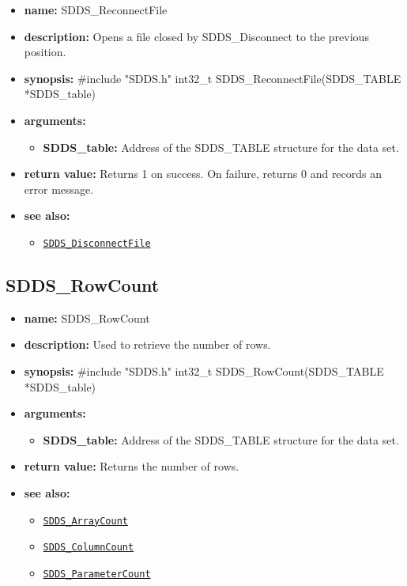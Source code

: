 \documentclass[11pt]{article}
\newcommand{\progref}[1]{\hyperref[SDDS_#1]{\tt SDDS\_#1}}
\begin{document}
\begin{itemize}
\item {\bf name:}\newline
SDDS\_ReconnectFile
\item {\bf description:}\newline
Opens a file closed by SDDS\_Disconnect to the previous position.
\item {\bf synopsis:} \#include "SDDS.h"\newline
int32\_t SDDS\_ReconnectFile(SDDS\_TABLE *SDDS\_table)
\item {\bf arguments:}
\begin{itemize}
\item {\bf SDDS\_table:} Address of the SDDS\_TABLE structure for the data set.
\end{itemize}
\item {\bf return value:}\newline
Returns 1 on success. On failure, returns 0 and records an error message.
\item {\bf see also:}
\begin{itemize}
\item \progref{DisconnectFile}
\end{itemize}
\end{itemize}

\subsection{SDDS\_RowCount}
\label{SDDS_RowCount}

\begin{itemize}
\item {\bf name:}\newline
SDDS\_RowCount
\item {\bf description:}\newline
Used to retrieve the number of rows.
\item {\bf synopsis:} \#include "SDDS.h"\newline
int32\_t SDDS\_RowCount(SDDS\_TABLE *SDDS\_table)
\item {\bf arguments:}
\begin{itemize}
\item {\bf SDDS\_table:} Address of the SDDS\_TABLE structure for the data set.
\end{itemize}
\item {\bf return value:}\newline
Returns the number of rows.
\item {\bf see also:}
\begin{itemize}
\item \progref{ArrayCount}
\item \progref{ColumnCount}
\item \progref{ParameterCount}
\end{itemize}
\end{itemize}
\end{document}
